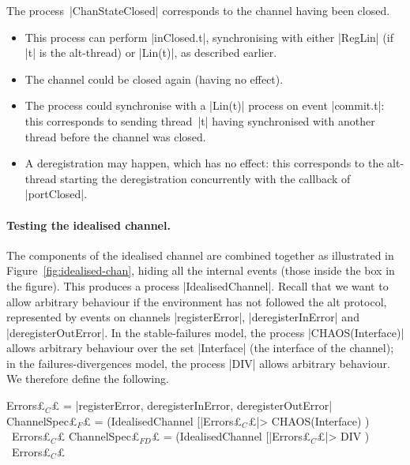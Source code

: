 
The process~|ChanStateClosed| 
corresponds to the channel having been closed.
%
\begin{itemize}
\item This process can perform |inClosed.t|, synchronising with either
  |RegLin| (if |t| is the alt-thread) or |Lin(t)|, as described earlier.

\item The channel could be closed again (having no effect).

\item The process could synchronise with a |Lin(t)| process on event
  |commit.t|: this corresponds to sending thread~|t| having synchronised with
  another thread before the channel was closed. 

\item A deregistration may happen, which has no effect: this corresponds to
  the alt-thread starting the deregistration concurrently with the callback of
  |portClosed|. 
\end{itemize}


\paragraph{Testing the idealised channel.}

The components of the idealised channel are combined together as illustrated
in Figure~\ref{fig:idealised-chan}, hiding all the internal events (those
inside the box in the figure).  This produces a process |IdealisedChannel|.
Recall that we want to allow arbitrary behaviour if the environment has not
followed the alt protocol, represented by events on channels |registerError|,
|deregisterInError| and |deregisterOutError|.  In the stable-failures model,
the process |CHAOS(Interface)| allows arbitrary behaviour over the set
|Interface| (the interface of the channel); in the failures-divergences model,
the process |DIV| allows arbitrary behaviour.  We therefore define the
following.
%
\begin{cspm}
Errors£$_C$£ = {|registerError, deregisterInError, deregisterOutError|}
ChannelSpec£$_F$£ = (IdealisedChannel [|Errors£$_C$£|> CHAOS(Interface) ) \ Errors£$_C$£
ChannelSpec£$_{FD}$£ = (IdealisedChannel [|Errors£$_C$£|> DIV ) \ Errors£$_C$£
\end{cspm}



